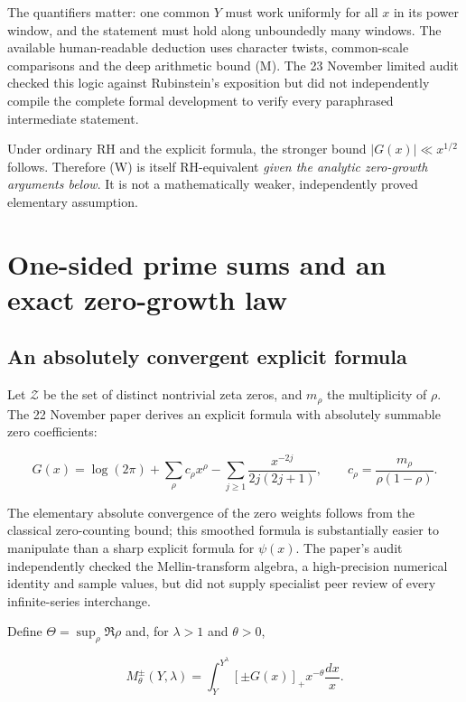 \documentclass[
  10pt,
  a4paper,
  10pt,
  oneside,
  openany]{book}
\begin{document}
The quantifiers matter: one common \(Y\) must work uniformly for all
\(x\) in its power window, and the statement must hold along unboundedly
many windows. The available human-readable deduction uses character
twists, common-scale comparisons and the deep arithmetic bound (M). The
23 November limited audit checked this logic against Rubinstein's
exposition but did not independently compile the complete formal
development to verify every paraphrased intermediate statement.

Under ordinary RH and the explicit formula, the stronger bound
\(|G(x)|\ll x^{1/2}\) follows. Therefore (W) is itself RH-equivalent
\emph{given the analytic zero-growth arguments below}. It is not a
mathematically weaker, independently proved elementary assumption.

\section{One-sided prime sums and an exact zero-growth
law}\label{one-sided-prime-sums-and-an-exact-zero-growth-law}

\subsection{An absolutely convergent explicit
formula}\label{an-absolutely-convergent-explicit-formula}

Let \(\mathcal Z\) be the set of distinct nontrivial zeta zeros, and
\(m_\rho\) the multiplicity of \(\rho\). The 22 November paper derives
an explicit formula with absolutely summable zero coefficients:

\[
G(x)=\log(2\pi)+\sum_{\rho}c_\rho x^\rho
-\sum_{j\ge1}\frac{x^{-2j}}{2j(2j+1)},
\qquad c_\rho=\frac{m_\rho}{\rho(1-\rho)}.
\tag{S10.1}\label{eq:S10.1}
\]

The elementary absolute convergence of the zero weights follows from the
classical zero-counting bound; this smoothed formula is substantially
easier to manipulate than a sharp explicit formula for \(\psi(x)\). The
paper's audit independently checked the Mellin-transform algebra, a
high-precision numerical identity and sample values, but did not supply
specialist peer review of every infinite-series interchange.

Define \(\Theta=\sup_\rho\Re\rho\) and, for \(\lambda>1\) and
\(\theta>0\),

\[
M_\theta^\pm(Y,\lambda)
=\int_Y^{Y^\lambda}[\pm G(x)]_+x^{-\theta}\frac{dx}{x}.
\tag{S10.2}\label{eq:S10.2}
\]
\end{document}
